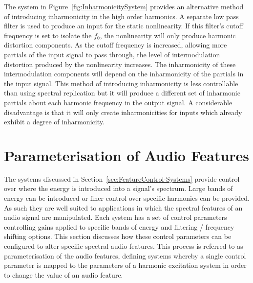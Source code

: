 		The system in Figure~\ref{fig:InharmonicitySystem} provides an alternative method of introducing
		inharmonicity in the high order harmonics. A separate low pass filter is used to produce an input for the
		static nonlinearity. If this filter's cutoff frequency is set to isolate the $f_{0}$, the nonlinearity will
		only produce harmonic distortion components. As the cutoff frequency is increased, allowing more partials
		of the input signal to pass through, the level of intermodulation distortion produced by the nonlinearity
		increases. The inharmonicity of these intermodulation components will depend on the inharmonicity of the
		partials in the input signal. This method of introducing inharmonicity is less controllable than using
		spectral replication but it will produce a different set of inharmonic partials about each harmonic
		frequency in the output signal. A considerable disadvantage is that it will only create inharmonicities for
		inputs which already exhibit a degree of inharmonicity.

\section{Parameterisation of Audio Features}
\label{sec:FeatureControl-Parameterisation}
	The systems discussed in Section~\ref{sec:FeatureControl-Systems} provide control over where the energy is
	introduced into a signal's spectrum. Large bands of energy can be introduced or finer control over specific
	harmonics can be provided. As such they are well suited to applications in which the spectral features of an audio
	signal are manipulated. Each system has a set of control parameters controlling gains applied to specific bands of
	energy and filtering / frequency shifting options. This section discusses how these control parameters can be
	configured to alter specific spectral audio features. This process is referred to as parameterisation of the audio
	features, defining systems whereby a single control parameter is mapped to the parameters of a harmonic excitation
	system in order to change the value of an audio feature.

